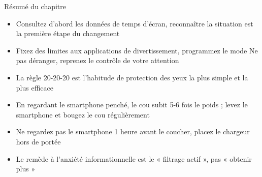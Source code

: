 \begin{tcbsummary}{Résumé du chapitre}
\begin{itemize}
  \item Consultez d'abord les données de temps d'écran, reconnaître la situation est la première étape du changement
  \item Fixez des limites aux applications de divertissement, programmez le mode Ne pas déranger, reprenez le contrôle de votre attention
  \item La règle 20-20-20 est l'habitude de protection des yeux la plus simple et la plus efficace
  \item En regardant le smartphone penché, le cou subit 5-6 fois le poids ; levez le smartphone et bougez le cou régulièrement
  \item Ne regardez pas le smartphone 1 heure avant le coucher, placez le chargeur hors de portée
  \item Le remède à l'anxiété informationnelle est le « filtrage actif », pas « obtenir plus »
\end{itemize}

\end{tcbsummary}
